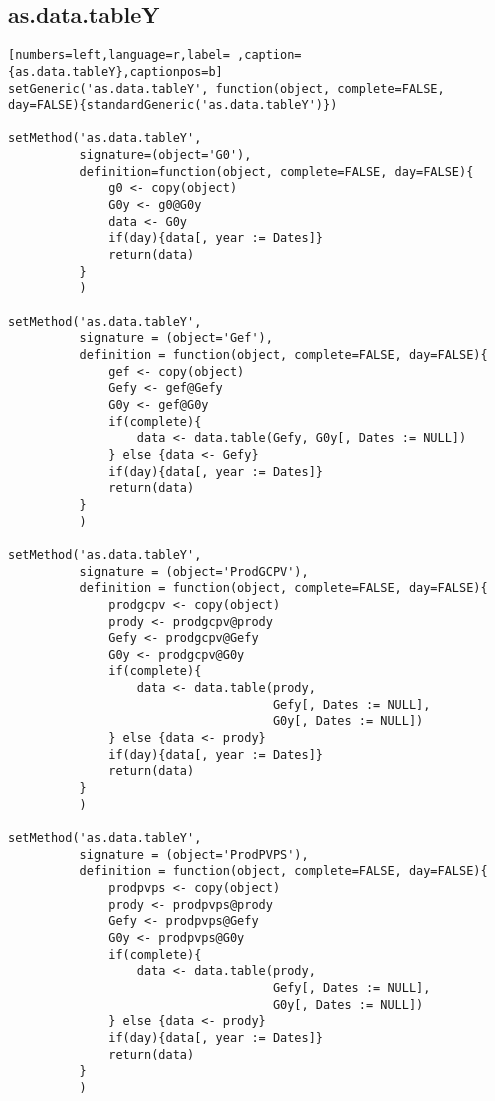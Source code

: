 \subsection{as.data.tableY}
\label{sec:org8303695}
\begin{lstlisting}[numbers=left,language=r,label= ,caption={as.data.tableY},captionpos=b]
setGeneric('as.data.tableY', function(object, complete=FALSE, day=FALSE){standardGeneric('as.data.tableY')})

setMethod('as.data.tableY',
          signature=(object='G0'),
          definition=function(object, complete=FALSE, day=FALSE){
              g0 <- copy(object)
              G0y <- g0@G0y
              data <- G0y
              if(day){data[, year := Dates]}
              return(data)
          }
          )

setMethod('as.data.tableY',
          signature = (object='Gef'),
          definition = function(object, complete=FALSE, day=FALSE){
              gef <- copy(object)
              Gefy <- gef@Gefy
              G0y <- gef@G0y
              if(complete){
                  data <- data.table(Gefy, G0y[, Dates := NULL])
              } else {data <- Gefy}
              if(day){data[, year := Dates]}
              return(data)
          }
          )

setMethod('as.data.tableY',
          signature = (object='ProdGCPV'),
          definition = function(object, complete=FALSE, day=FALSE){
              prodgcpv <- copy(object)
              prody <- prodgcpv@prody
              Gefy <- prodgcpv@Gefy
              G0y <- prodgcpv@G0y
              if(complete){
                  data <- data.table(prody,
                                     Gefy[, Dates := NULL],
                                     G0y[, Dates := NULL])       
              } else {data <- prody}
              if(day){data[, year := Dates]}
              return(data)
          }
          )

setMethod('as.data.tableY',
          signature = (object='ProdPVPS'),
          definition = function(object, complete=FALSE, day=FALSE){
              prodpvps <- copy(object)
              prody <- prodpvps@prody
              Gefy <- prodpvps@Gefy
              G0y <- prodpvps@G0y
              if(complete){
                  data <- data.table(prody,
                                     Gefy[, Dates := NULL],
                                     G0y[, Dates := NULL])       
              } else {data <- prody}
              if(day){data[, year := Dates]}
              return(data)
          }
          )
\end{lstlisting}
